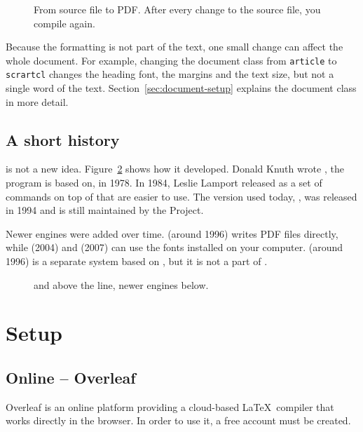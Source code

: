 \begin{figure}[htbp]
    \centering
    
    \caption{From source file to PDF. After every change to the source file, you compile again.}
    \label{fig:pipeline}
\end{figure}

Because the formatting is not part of the text, one small change can affect the whole document.
For example, changing the document class from \texttt{article} to \texttt{scrartcl} changes the heading font, the margins and the text size,
but not a single word of the text.
Section~\ref{sec:document-setup} explains the document class in more detail.  %

\subsection{A short history}\label{sec:history}

 is not a new idea.
Figure~\ref{fig:tex-timeline} shows how it developed.
Donald Knuth wrote , the program  is based on, in 1978.
In 1984, Leslie Lamport released  as a set of commands on top of  that are easier to use.
The version used today, , was released in 1994 and is still maintained by the  Project.

Newer engines were added over time.
 (around 1996) writes PDF files directly,
while  (2004) and  (2007) can use the fonts installed on your computer.
 (around 1996) is a separate system based on , but it is not a part of .

\begin{figure}[htbp]
    \centering
    \newcommand{\timelineunit}{0.36cm}
    
    \caption{ and  above the line, newer engines below.}
    \label{fig:tex-timeline}
\end{figure}

\section{Setup}


\subsection{Online -- Overleaf}
Overleaf is an online platform providing a cloud-based \LaTeX\ compiler that works directly in the browser. 
In order to use it, a free account must be created.

